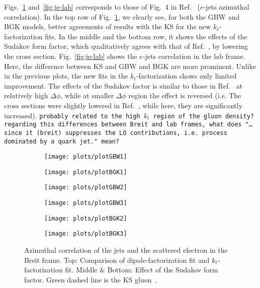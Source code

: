 \documentclass[a4,12pt]{article}
\newcommand{\comment}[1]{\texttt{\color{red}#1}}
\begin{document}
Figs.~\ref{fig:je-breit} and~\ref{fig:je-lab} corresponds to those of Fig.~4 in Ref.~\cite{vanHameren:2021sqc} ($e$-jets azimuthal correlation). 
In the top row of Fig.~\ref{fig:je-breit}, we clearly see, for both the GBW and BGK models, better agreements of results with the KS for the new $k_t$-factorization fits. In the middle and the bottom row, it shows the effects of the Sudakov form factor, which qualitatively agrees with that of Ref.~\cite{vanHameren:2021sqc}, by lowering the cross section.
Fig.~\ref{fig:je-lab} shows the $e$-jets correlation in the lab frame. Here, the difference between KS and GBW and BGK are more prominent. Unlike in the previous plots, the new fits in the $k_t$-factorization shows only limited improvement.
The effects of the Sudakov factor is similar to those in Ref.~\cite{vanHameren:2021sqc} at relatively high $\Delta \phi$, while at smaller $\Delta \phi$ region the effect is reversed (i.e. The cross sections were slightly lowered in Ref.~\cite{vanHameren:2021sqc}, while here, they are significantly increased). \comment{probably related to the high $k_t$ region of the gluon density?}\\
\comment{regarding this differences between Breit and lab frames, what does "\dots since it (breit) suppresses the LO contributions, i.e. process dominated by a quark jet." mean?}

\begin{figure}[p]
	\begin{subfigure}{0.5\textwidth}
	\texttt{[image: plots/plotGBW1]} 
	\end{subfigure}
	\begin{subfigure}{0.5\textwidth}
	\texttt{[image: plots/plotBGK1]} 
	\end{subfigure}
	\begin{subfigure}{0.5\textwidth}
	\texttt{[image: plots/plotGBW2]}
	\end{subfigure}
	\begin{subfigure}{0.5\textwidth}
	\texttt{[image: plots/plotGBW3]}
	\end{subfigure}
	\begin{subfigure}{0.5\textwidth}
	\texttt{[image: plots/plotBGK2]}
	\end{subfigure}
	\begin{subfigure}{0.5\textwidth}
	\texttt{[image: plots/plotBGK3]}
	\end{subfigure}
	\caption{\footnotesize Azimuthal correlation of the jets and the scattered electron in the Breit frame. Top: Comparison of dipole-factorization fit and $k_t$-factorization fit. Middle \& Bottom: Effect of the Sudakov form factor.   Green dashed line is the KS gluon~\cite{vanHameren:2021sqc}.}
	\label{fig:je-breit}
\end{figure}
\end{document}
